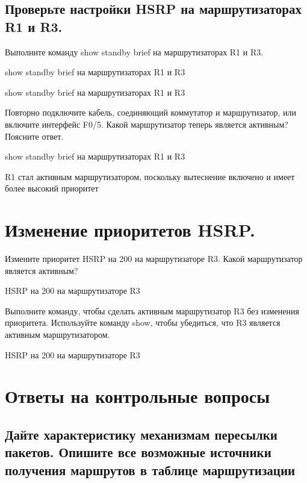 \subsection{Проверьте настройки HSRP на маршрутизаторах R1 и R3.}
Выполните команду show standby brief на маршрутизаторах R1 и R3.
\begin{image}
    \caption{show standby brief на маршрутизаторах R1 и R3}
\end{image}

show standby brief на маршрутизаторах R1 и R3

Повторно подключите кабель, соединяющий коммутатор и маршрутизатор, или включите интерфейс F0/5.
Какой маршрутизатор теперь является активным?
Поясните ответ.
\begin{image}
    \caption{show standby brief на маршрутизаторах R1 и R3}
\end{image}

R1 стал активным маршрутизатором, поскольку вытеснение включено и имеет более высокий приоритет
\section{Изменение приоритетов HSRP.}

Измените приоритет HSRP на 200 на маршрутизаторе R3. Какой маршрутизатор является
активным?

\begin{image}
    \caption{ HSRP на 200 на маршрутизаторе R3}
\end{image}

Выполните команду, чтобы сделать активным маршрутизатор R3 без изменения приоритета.
Используйте команду show, чтобы убедиться, что R3 является активным маршрутизатором.
\begin{image}
    \caption{ HSRP на 200 на маршрутизаторе R3}
\end{image}

\section{Ответы на контрольные вопросы}

\subsection{Дайте характеристику механизмам пересылки пакетов.
Опишите все возможные источники получения маршрутов
в таблице маршрутизации}

